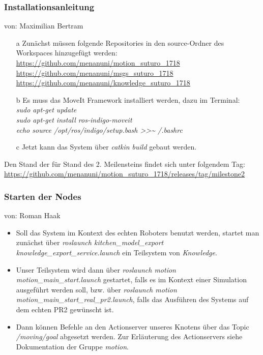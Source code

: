 \documentclass{suturo}
\makeatletter
\newcommand{\chapterauthor}[1]{%
  {\parindent0pt\vspace*{-27pt}%
  \linespread{0}\small\begin{flushright}von: #1\end{flushright}%
  \par\nobreak\vspace*{0pt}}
  \@afterheading%
}
\makeatother
\begin{document}
\subsubsection{Installationsanleitung}
\chapterauthor{Maximilian Bertram}

\begin{itemize}
\item[a] Zunächst müssen folgende Repositories in den source-Ordner des Workspaces hinzugefügt werden:  \\
\url{https://github.com/menanuni/motion_suturo_1718} \\
\url{https://github.com/menanuni/msgs_suturo_1718} \\
\url{https://github.com/menanuni/knowledge_suturo_1718} \\

\item[b] Es muss das MoveIt Framework installiert werden, dazu im Terminal: \\
\textit{sudo apt-get update} \\
\textit{sudo apt-get install ros-indigo-moveit} \\
\textit{echo  \grqq{}source /opt/ros/indigo/setup.bash\grqq{} \textgreater\textgreater \textasciitilde{ }/.bashrc} \\

\item[c] Jetzt kann das System über \textit{catkin build} gebaut werden.
\end{itemize}

Den Stand der für Stand  des 2. Meilensteins findet sich unter folgendem Tag: \\
\url{https://github.com/menanuni/motion_suturo_1718/releases/tag/milestone2} \\

\subsubsection{Starten der Nodes}
\chapterauthor{Roman Haak}
\begin{itemize}

\item Soll das System im Kontext des echten Roboters benutzt werden, startet man zunächst über \textit{roslaunch kitchen\_model\_export knowledge\_export\_service.launch} ein Teilsystem von \textit{Knowledge}.

\item Unser Teilsystem wird dann über \textit{roslaunch motion motion\_main\_start.launch} gestartet, falls es im Kontext einer Simulation ausgeführt werden soll, bzw. über \textit{roslaunch motion motion\_main\_start\_real\_pr2.launch}, falls das Ausführen des Systems auf dem echten PR2 gewünscht ist.

\item Dann können Befehle an den Actionserver unseres Knotens über das Topic \textit{/moving/goal} abgesetzt werden. Zur Erläuterung des Actionservers siehe Dokumentation der Gruppe \textit{motion}.
\end{itemize}
\end{document}
